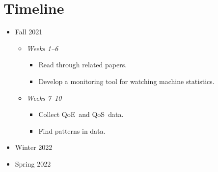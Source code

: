 \section{Timeline}\label{timeline}
\begin{itemize}
    \item Fall 2021 \begin{itemize}
        \item \emph{Weeks 1--6} \begin{itemize}
            \item Read through related papers.
            \item Develop a monitoring tool for watching machine statistics.
        \end{itemize}
        \item \emph{Weeks 7--10} \begin{itemize}
            \item Collect QoE~and QoS~data.
            \item Find patterns in data.
        \end{itemize}
    \end{itemize}

    \item Winter 2022
    \item Spring 2022
\end{itemize}
